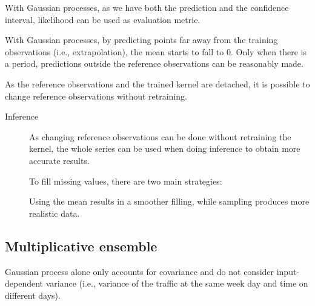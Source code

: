\begin{remark}
    With Gaussian processes, as we have both the prediction and the confidence interval, likelihood can be used as evaluation metric.
\end{remark}

\begin{remark}
    With Gaussian processes, by predicting points far away from the training observations (i.e., extrapolation), the mean starts to fall to $0$. Only when there is a period, predictions outside the reference observations can be reasonably made.
\end{remark}

\begin{remark}
    As the reference observations and the trained kernel are detached, it is possible to change reference observations without retraining.
\end{remark}

\begin{description}
    \item[Inference]
        As changing reference observations can be done without retraining the kernel, the whole series can be used when doing inference to obtain more accurate results.

        To fill missing values, there are two main strategies:
        \begin{remark}
            Using the mean results in a smoother filling, while sampling produces more realistic data.
        \end{remark}
\end{description}


\subsection{Multiplicative ensemble}

\begin{remark}
    Gaussian process alone only accounts for covariance and do not consider input-dependent variance (i.e., variance of the traffic at the same week day and time on different days).
\end{remark}

